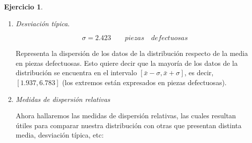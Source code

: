 \documentclass[a4paper, 12pt]{article}
\theoremstyle{definition}
\newtheorem{ej}{Ejercicio}
\begin{document}
\begin{ej}
\begin{enumerate}[label=\textit{\alph*)}]
\begin{enumerate}[label=\arabic*)]
        \item \textit{Desviación típica}.
        
        \begin{center}
            \end{center}
        
        \[
        \sigma = 2.423\qquad piezas\quad defectuosas
        \]
        
        Representa la dispersión de los datos de la distribución respecto de la media en piezas defectuosas. Esto quiere decir que la mayoría de los datos de la distribución se encuentra en el intervalo $[\bar{x}-\sigma, \bar{x} + \sigma]$, es decir, $[1.937, 6.783]$ (los extremos están expresados en piezas defectuosas).
        
        \item \textit{Medidas de dispersión relativas}
        
        Ahora hallaremos las medidas de dispersión relativas, las cuales resultan útiles para comparar nuestra distribución con otras que presentan distinta media, desviación típica, etc:
        

\end{enumerate}
\end{enumerate}
\end{ej}
\end{document}
